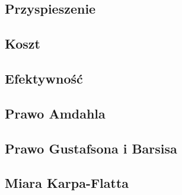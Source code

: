 \subsection{Przyspieszenie}


\subsection{Koszt}


\subsection{Efektywność}


\subsection{Prawo Amdahla}


\subsection{Prawo Gustafsona i Barsisa}


\subsection{Miara Karpa-Flatta}
